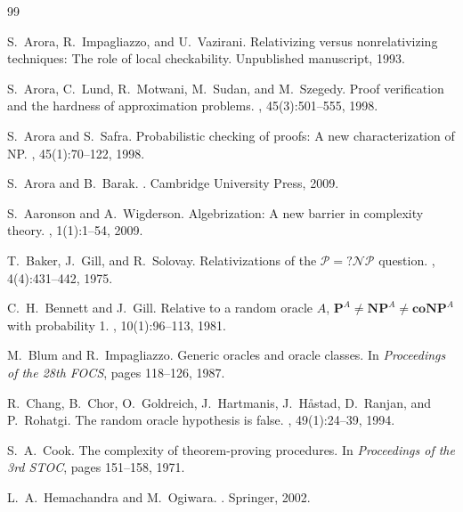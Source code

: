 \documentclass[11pt,a4paper]{article}
\theoremstyle{plain}
\theoremstyle{definition}
\theoremstyle{remark}
\begin{document}
\begin{thebibliography}{99}

S.~Arora, R.~Impagliazzo, and U.~Vazirani.
\newblock Relativizing versus nonrelativizing techniques: The role of local checkability.
\newblock Unpublished manuscript, 1993.

S.~Arora, C.~Lund, R.~Motwani, M.~Sudan, and M.~Szegedy.
\newblock Proof verification and the hardness of approximation problems.
, 45(3):501--555, 1998.

S.~Arora and S.~Safra.
\newblock Probabilistic checking of proofs: A new characterization of NP.
, 45(1):70--122, 1998.

S.~Arora and B.~Barak.
.
\newblock Cambridge University Press, 2009.

S.~Aaronson and A.~Wigderson.
\newblock Algebrization: A new barrier in complexity theory.
, 1(1):1--54, 2009.

T.~Baker, J.~Gill, and R.~Solovay.
\newblock Relativizations of the $\mathcal{P} = ?\mathcal{NP}$ question.
, 4(4):431--442, 1975.

C.~H.~Bennett and J.~Gill.
\newblock Relative to a random oracle $A$, $\mathbf{P}^A \neq \mathbf{NP}^A \neq
\mathbf{coNP}^A$ with probability 1.
, 10(1):96--113, 1981.

M.~Blum and R.~Impagliazzo.
\newblock Generic oracles and oracle classes.
\newblock In {\em Proceedings of the 28th FOCS}, pages 118--126, 1987.

R.~Chang, B.~Chor, O.~Goldreich, J.~Hartmanis, J.~H\r{a}stad, D.~Ranjan, and
P.~Rohatgi.
\newblock The random oracle hypothesis is false.
, 49(1):24--39, 1994.

S.~A.~Cook.
\newblock The complexity of theorem-proving procedures.
\newblock In {\em Proceedings of the 3rd STOC}, pages 151--158, 1971.

L.~A.~Hemachandra and M.~Ogiwara.
.
\newblock Springer, 2002.


\end{thebibliography}
\end{document}
